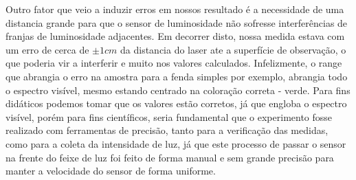 Outro fator que veio a induzir erros em nossos resultado é a necessidade de uma distancia grande para que o sensor de luminosidade não sofresse interferências de franjas de luminosidade adjacentes. Em decorrer disto, nossa medida estava com um erro de cerca de $\pm1cm$ da distancia do laser ate a superfície de observação, o que poderia vir a interferir e muito nos valores calculados. Infelizmente, o range que abrangia o erro na amostra para a fenda simples por exemplo, abrangia todo o espectro visível, mesmo estando centrado na coloração correta - verde. Para fins didáticos podemos tomar que os valores estão corretos, já que engloba o espectro visível, porém para fins científicos, seria fundamental que o experimento fosse realizado com ferramentas de precisão, tanto para a verificação das medidas, como para a coleta da intensidade de luz, já que este processo de passar o sensor na frente do feixe de luz foi feito de forma manual e sem grande precisão para manter a velocidade do sensor de forma uniforme.
